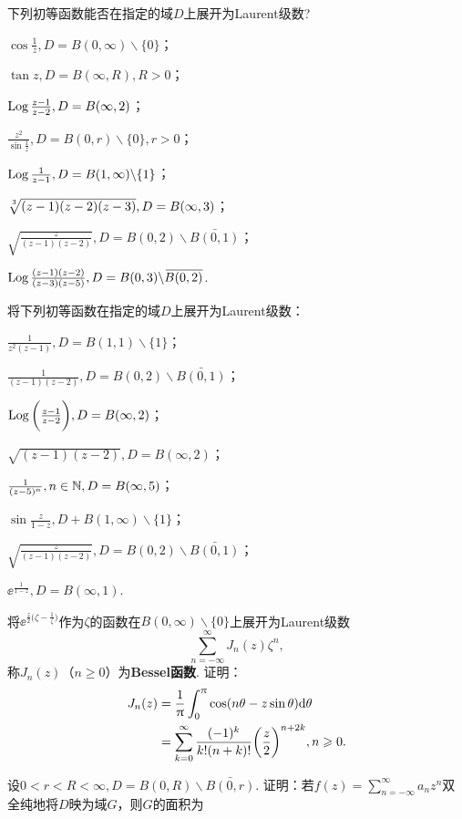 \begin{xiti}
\item 下列初等函数能否在指定的域$D$上展开为Laurent级数?
\begin{enuma}
  \item $\cos\frac1z,D=B(0,\infty)\backslash\{0\}$；
  \item $\tan z,D=B(\infty,R),R>0$；
  \item $\Log\frac{z-1}{z-2},D=B(\infty,2)$；
  \item $\frac{z^2}{\sin\frac1z},D=B(0,r)\backslash\{0\},r>0$；
  \item $\Log\frac1{z-1},D=B(1,\infty)\backslash\{1\}$；
  \item $\sqrt[\leftroot{-1}\uproot{2}3]{(z-1)(z-2)(z-3)},D=B(\infty,3)$；
  \item $\sqrt{\frac z{(z-1)(z-2)}},D=B(0,2)\backslash\bar{B(0,1)}$；
  \item $\Log\frac{(z-1)(z-2)}{(z-3)(z-5)},D=B(0,3)\backslash\bar{B(0,2)}$.
\end{enuma}
\item 将下列初等函数在指定的域$D$上展开为Laurent级数：
\begin{enuma}
  \item $\frac1{z^2(z-1)},D=B(1,1)\backslash\{1\}$；
  \item $\frac1{(z-1)(z-2)},D=B(0,2)\backslash\bar{B(0,1)}$；
  \item $\Log\bigg(\frac{z-1}{z-2}\bigg),D=B(\infty,2)$；
  \item $\sqrt{(z-1)(z-2)},D=B(\infty,2)$；
  \item $\frac1{(z-5)^n},n\in\MN,D=B(\infty,5)$；
  \item $\sin\frac z{1-z},D+B(1,\infty)\backslash\{1\}$；
  \item $\sqrt{\frac z{(z-1)(z-2)}},D=B(0,2)\backslash\bar{B(0,1)}$；
  \item $\ee^{\frac1{1-z}},D=B(\infty,1)$.
\end{enuma}
\item 将$\ee^{\frac z2\big(\zeta-\frac1\zeta\big)}$作为$\zeta$的函数在$B(0,\infty)\backslash\{0\}$上展开为Laurent级数
    \[\sum_{n=-\infty}^\infty J_n(z)\zeta^n,\]
称$J_n(z)$（$n\ge0$）为\textbf{Bessel函数}. 证明：
\begin{align*}
J_n(z)&=\frac1\pi\int_0^\pi\cos(n\theta-z\sin\theta)\textrm d\theta\\
&=\sum_{k=0}^\infty\frac{(-1)^k}{k!(n+k)!}\bigg(\frac z2\bigg)^{n+2k},n\ge0.
\end{align*}
\item \hypertarget{xiti5.1.4}{} 设$0<r<R<\infty,D=B(0,R)\backslash\bar{B(0,r)}$. 证明：若$f(z)=\sum_{n=-\infty}^\infty a_nz^n$双全纯地将$D$映为域$G$，则$G$的面积为

\end{xiti}
